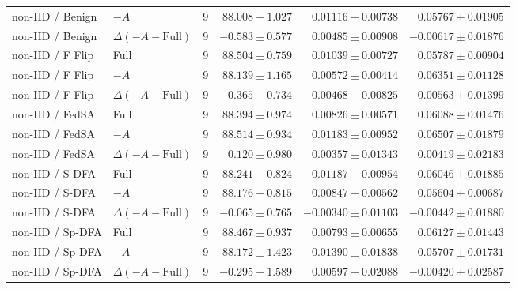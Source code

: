 \begin{table}[t]
\begin{tabular}{llrrrr}
non-IID / Benign & $-A$ & 9 & $88.008 \pm 1.027$ & $0.01116 \pm 0.00738$ & $0.05767 \pm 0.01905$ \\
non-IID / Benign & $\Delta(-A-\mathrm{Full})$ & 9 & $-0.583 \pm 0.577$ & $0.00485 \pm 0.00908$ & $-0.00617 \pm 0.01876$ \\
non-IID / F Flip & Full & 9 & $88.504 \pm 0.759$ & $0.01039 \pm 0.00727$ & $0.05787 \pm 0.00904$ \\
non-IID / F Flip & $-A$ & 9 & $88.139 \pm 1.165$ & $0.00572 \pm 0.00414$ & $0.06351 \pm 0.01128$ \\
non-IID / F Flip & $\Delta(-A-\mathrm{Full})$ & 9 & $-0.365 \pm 0.734$ & $-0.00468 \pm 0.00825$ & $0.00563 \pm 0.01399$ \\
non-IID / FedSA & Full & 9 & $88.394 \pm 0.974$ & $0.00826 \pm 0.00571$ & $0.06088 \pm 0.01476$ \\
non-IID / FedSA & $-A$ & 9 & $88.514 \pm 0.934$ & $0.01183 \pm 0.00952$ & $0.06507 \pm 0.01879$ \\
non-IID / FedSA & $\Delta(-A-\mathrm{Full})$ & 9 & $0.120 \pm 0.980$ & $0.00357 \pm 0.01343$ & $0.00419 \pm 0.02183$ \\
non-IID / S-DFA & Full & 9 & $88.241 \pm 0.824$ & $0.01187 \pm 0.00954$ & $0.06046 \pm 0.01885$ \\
non-IID / S-DFA & $-A$ & 9 & $88.176 \pm 0.815$ & $0.00847 \pm 0.00562$ & $0.05604 \pm 0.00687$ \\
non-IID / S-DFA & $\Delta(-A-\mathrm{Full})$ & 9 & $-0.065 \pm 0.765$ & $-0.00340 \pm 0.01103$ & $-0.00442 \pm 0.01880$ \\
non-IID / Sp-DFA & Full & 9 & $88.467 \pm 0.937$ & $0.00793 \pm 0.00655$ & $0.06127 \pm 0.01443$ \\
non-IID / Sp-DFA & $-A$ & 9 & $88.172 \pm 1.423$ & $0.01390 \pm 0.01838$ & $0.05707 \pm 0.01731$ \\
non-IID / Sp-DFA & $\Delta(-A-\mathrm{Full})$ & 9 & $-0.295 \pm 1.589$ & $0.00597 \pm 0.02088$ & $-0.00420 \pm 0.02587$ \\
\bottomrule
\end{tabular}
\end{table}

